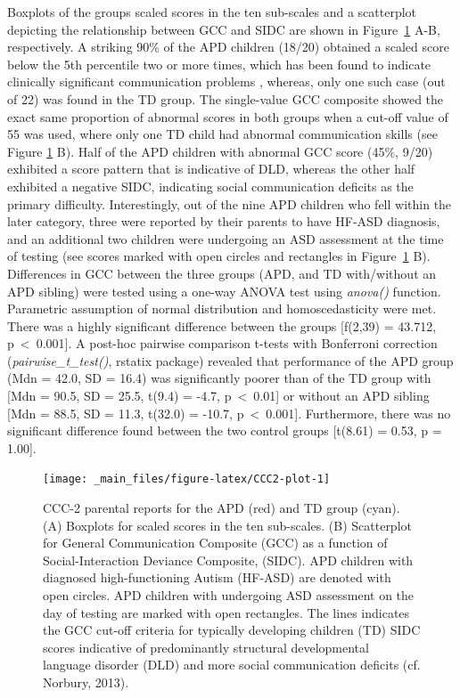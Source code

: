 \documentclass[a4paper, twoside]{templates/ociamthesis}
\begin{document}
Boxplots of the groups scaled scores in the ten sub-scales and a scatterplot depicting the relationship between GCC and SIDC are shown in Figure~\ref{fig:CCC2-plot} A-B, respectively. A striking 90\% of the APD children (18/20) obtained a scaled score below the 5th percentile two or more times, which has been found to indicate clinically significant communication problems \autocite{Bishop2003}, whereas, only one such case (out of 22) was found in the TD group. The single-value GCC composite showed the exact same proportion of abnormal scores in both groups when a cut-off value of 55 was used, where only one TD child had abnormal communication skills (see Figure \ref{fig:CCC2-plot} B). Half of the APD children with abnormal GCC score (45\%, 9/20) exhibited a score pattern that is indicative of DLD, whereas the other half exhibited a negative SIDC, indicating social communication deficits as the primary difficulty. Interestingly, out of the nine APD children who fell within the later category, three were reported by their parents to have HF-ASD diagnosis, and an additional two children were undergoing an ASD assessment at the time of testing (see scores marked with open circles and rectangles in Figure~\ref{fig:CCC2-plot} B). Differences in GCC between the three groups (APD, and TD with/without an APD sibling) were tested using a one-way ANOVA test using \emph{anova()} function. Parametric assumption of normal distribution and homoscedasticity were met. There was a highly significant difference between the groups {[}f(2,39) = 43.712, p~\textless~0.001{]}. A post-hoc pairwise comparison t-tests with Bonferroni correction (\emph{pairwise\_t\_test()}, rstatix package) revealed that performance of the APD group (Mdn = 42.0, SD = 16.4) was significantly poorer than of the TD group with {[}Mdn = 90.5, SD = 25.5, t(9.4) = -4.7, p~\textless~0.01{]} or without an APD sibling {[}Mdn = 88.5, SD = 11.3, t(32.0) = -10.7, p~\textless~0.001{]}. Furthermore, there was no significant difference found between the two control groups {[}t(8.61) = 0.53, p = 1.00{]}.\\

\begin{figure}

{\centering \texttt{[image: \_main\_files/figure-latex/CCC2-plot-1]} 

}

\caption{CCC-2 parental reports for the APD (red) and TD group (cyan). (A) Boxplots for scaled scores in the ten sub-scales. (B) Scatterplot for General Communication Composite (GCC) as a function of Social-Interaction Deviance Composite, (SIDC). APD children with diagnosed high-functioning Autism (HF-ASD) are denoted with open circles. APD children with undergoing ASD assessment on the day of testing are marked with open rectangles. The lines indicates the GCC cut-off criteria for typically developing children (TD) SIDC scores indicative of predominantly structural developmental language disorder (DLD) and more social communication deficits (cf. Norbury, 2013).}\label{fig:CCC2-plot}
\end{figure}
\end{document}
